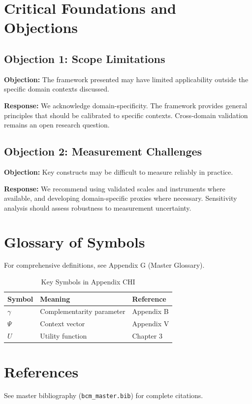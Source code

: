 \documentclass[11pt]{article}
\begin{document}

\section{Critical Foundations and Objections}
\label{sec:chi-foundations}

\subsection{Objection 1: Scope Limitations}

\textbf{Objection:} The framework presented may have limited applicability
outside the specific domain contexts discussed.

\textbf{Response:} We acknowledge domain-specificity. The framework provides
general principles that should be calibrated to specific contexts. Cross-domain
validation remains an open research question.

\subsection{Objection 2: Measurement Challenges}

\textbf{Objection:} Key constructs may be difficult to measure reliably in
practice.

\textbf{Response:} We recommend using validated scales and instruments where
available, and developing domain-specific proxies where necessary. Sensitivity
analysis should assess robustness to measurement uncertainty.



\section{Glossary of Symbols}
\label{sec:chi-glossary}

For comprehensive definitions, see Appendix G (Master Glossary).

\begin{table}[htbp]
\centering
\caption{Key Symbols in Appendix CHI}
\begin{tabular}{lll}
\toprule
\textbf{Symbol} & \textbf{Meaning} & \textbf{Reference} \\
\midrule
$\gamma$ & Complementarity parameter & Appendix B \\
$\Psi$ & Context vector & Appendix V \\
$U$ & Utility function & Chapter 3 \\
\bottomrule
\end{tabular}
\end{table}


\section{References}
\label{sec:references}

See master bibliography (\texttt{bcm\_master.bib}) for complete citations.

\nocite{bcm_master}
\end{document}
